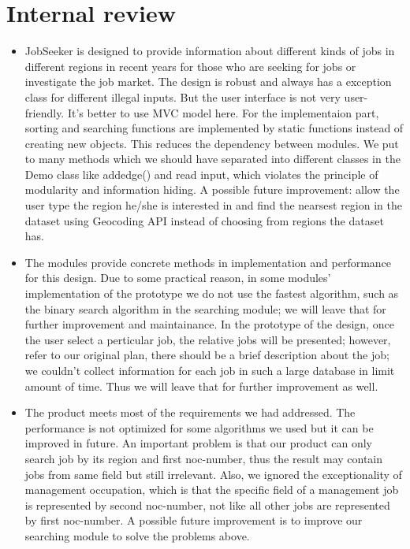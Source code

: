 \documentclass[12pt]{article}
\begin{document}
\section{Internal review}
\begin{itemize}
\item JobSeeker is designed to provide information about different kinds of jobs in different regions in recent years for those who are seeking for jobs or investigate the job market. The design is robust and always has a exception class for different illegal inputs. But the user interface is not very user-friendly. It's better to use MVC model here. For the implementaion part, sorting and searching functions are implemented by static functions instead of creating new objects. This reduces the dependency between modules. We put to many methods which we should have separated into different classes in the Demo class like addedge() and read input, which violates the principle of modularity and information hiding. A possible future improvement: allow the user type the region he/she is interested in and find the nearsest region in the dataset using Geocoding API instead of choosing from regions the dataset has.
\item The modules provide concrete methods in implementation and performance for this design. Due to some practical reason, in some modules' implementation of the prototype we do not use the fastest algorithm, such as the binary search algorithm in the searching module; we will leave that for further improvement and maintainance. In the prototype of the design, once the user select a perticular job, the relative jobs will be presented; however, refer to our original plan, there should be a brief description about the job; we couldn't collect information for each job in such a large database in limit amount of time. Thus we will leave that for further improvement as well.
\item The product meets most of the requirements we had addressed. The performance is not optimized for some algorithms we used but it can be improved in future. An important problem is that our product can only search job by its region and first noc-number, thus the result may contain jobs from same field but still irrelevant. Also, we ignored the exceptionality of management occupation, which is that the specific field of a management job is represented by second noc-number, not like all other jobs are represented by first noc-number.  A possible future improvement is to improve our searching module to solve the problems above.
\end{itemize}
\newpage
\end{document}

